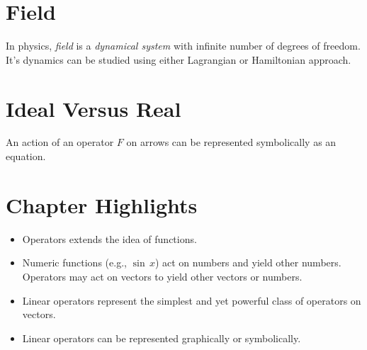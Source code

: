 \section{Field}\label{sec:Field}
In physics, \emph{field} is a \emph{dynamical system} with infinite number of degrees of freedom. It's dynamics can be studied using either Lagrangian or Hamiltonian approach.

\section{Ideal Versus Real}\label{sec:IdealVsReal}
An action of an operator $F$ on arrows can be represented symbolically
as an equation.



\section*{Chapter Highlights}
{\chhc
  \it  
\begin{itemize}
\item Operators extends the idea of functions.
\item Numeric functions (e.g., $\sin\,x$) act on numbers and yield
  other numbers. Operators may act on vectors to yield other vectors
  or numbers.
\item Linear operators represent the simplest and yet powerful class
  of operators on vectors.
\item Linear operators can be represented graphically or symbolically.
\end{itemize}

}
